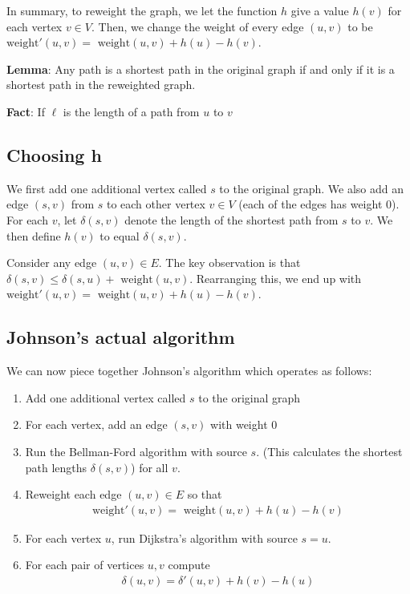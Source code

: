 \documentclass[11pt,a4paper,titlepage,dvipsnames,cmyk]{scrartcl}
\begin{document}
In summary, to reweight the graph, we let the function $h$ give a value
$h(v)$ for each vertex $v\in V$. Then, we change the weight of every edge
$(u,v)$ to be $\text{weight}'(u,v) = \text{ weight}(u,v) + h(u) - h(v)$.

\textbf{Lemma}: Any path is a shortest path in the original graph if and
only if it is a shortest path in the reweighted graph.

\textbf{Fact}: If $\ell$ is the length of a path from $u$ to $v$ %

\subsection{Choosing h}%
\label{sub:Choosing-h}
We first add one additional vertex called $s$ to the original graph. We
also add an edge $(s,v)$ from $s$ to each other vertex $v \in V$ (each of
the edges has weight 0). For each $v$, let $\delta(s,v)$ denote the length
of the shortest path from $s$ to $v$. We then define $h(v)$ to equal
$\delta(s,v)$.

Consider any edge $(u,v) \in E$. The key observation is that $\delta(s,v)
\le \delta(s,u) + \text{ weight}(u,v)$. Rearranging this, we end up with
$\text{weight}'(u,v) = \text{ weight} (u,v) + h(u) - h(v)$.

\subsection{Johnson's actual algorithm}%
\label{sub:real-johnson}
We can now piece together Johnson's algorithm which operates as follows:
\begin{enumerate}
    \item Add one additional vertex called $s$ to the original graph
    \item For each vertex, add an edge $(s,v)$ with weight 0
    \item Run the Bellman-Ford algorithm with source $s$. (This calculates
        the shortest path lengths $\delta(s,v)$) for all $v$.
    \item Reweight each edge $(u,v) \in E$ so that 
        \begin{align*}
            \text{weight}'(u,v) = \text{ weight}(u,v) + h(u) - h(v)
        \end{align*}
    \item For each vertex $u$, run Dijkstra's algorithm with source $s =
        u$.
    \item For each pair of vertices $u,v$ compute
        \begin{align*}
            \delta(u,v) = \delta'(u,v) + h(v) - h(u)
        \end{align*}
\end{enumerate}
\end{document}
